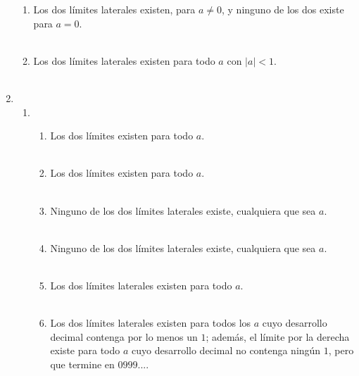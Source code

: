 \begin{enumerate}
\begin{enumerate}[\bfseries (i)]
    \item Los dos límites laterales existen, para $a\neq 0$, y ninguno de los dos existe para $a=0$.\\\\

    \item Los dos límites laterales existen para todo $a$ con $|a|<1$.\\\\

\end{enumerate}

\item 

\begin{enumerate}[\bfseries (a)]

    \item 

\begin{enumerate}[\bfseries (i)]

    \item Los dos límites existen para todo $a$.\\\\

    \item Los dos límites existen para todo $a$.\\\\

    \item Ninguno de los dos límites laterales existe, cualquiera que sea $a$.\\\\

    \item Ninguno de los dos límites laterales existe, cualquiera que sea $a$.\\\\

    \item Los dos límites laterales existen para todo $a$.\\\\

    \item Los dos límites laterales existen para todos los $a$ cuyo desarrollo decimal contenga por lo menos un $1$; además, el límite por la derecha existe para todo $a$ cuyo desarrollo decimal no contenga ningún $1$, pero que termine en $0999...$.\\\\


\end{enumerate}
\end{enumerate}
\end{enumerate}
